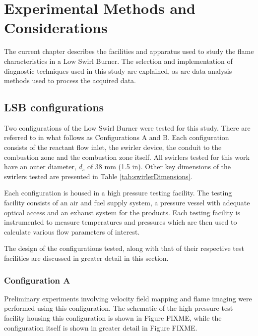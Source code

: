 \chapter{Experimental Methods and Considerations}

The current chapter describes the facilities and apparatus used to study the flame characteristics in a Low Swirl Burner.
The selection and implementation of diagnostic techniques used in this study are explained, as are data analysis methods used to process the acquired data.

\section{LSB configurations}

Two configurations of the Low Swirl Burner were tested for this study.
There are referred to in what follows as Configurations A and B.
Each configuration consists of the reactant flow inlet, the swirler device, the conduit to the combustion zone and the combustion zone itself.
All swirlers tested for this work have an outer diameter, \(d_s\) of 38 mm (1.5 in).
Other key dimensions of the swirlers tested are presented in Table \ref{tab:swirlerDimensions}.

Each configuration is housed in a high pressure testing facility.
The testing facility consists of an air and fuel supply system, a pressure vessel with adequate optical access and an exhaust system for the products.
Each testing facility is instrumented to measure temperatures and pressures which are then used to calculate various flow parameters of interest.

The design of the configurations tested, along with that of their respective test facilities are discussed in greater detail in this section.



\subsection{Configuration A}

Preliminary experiments involving velocity field mapping and flame imaging were performed using this configuration.
The schematic of the high pressure test facility housing this configuration is shown in Figure FIXME, while the configuration itself is shown in greater detail in Figure FIXME.

